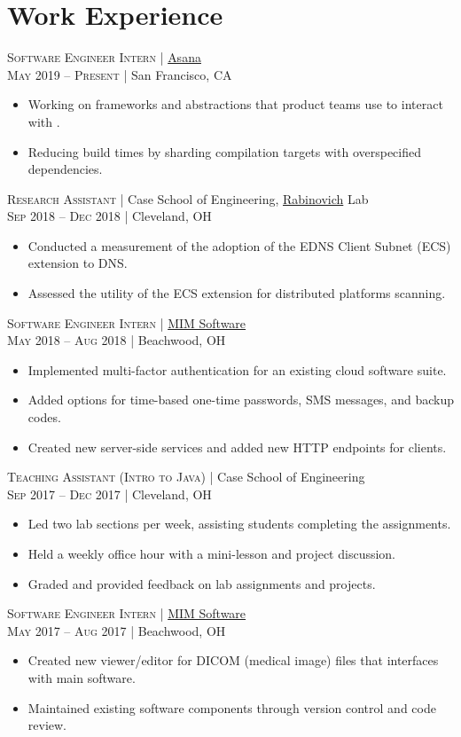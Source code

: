 \documentclass[a4paper,11pt]{article}
\begin{document}
\section{Work Experience}
\textsc{Software Engineer Intern} | \href{https://asana.com}{Asana} \\
\textsc{May 2019 – Present} | San Francisco, CA
\begin{itemize}
	\item Working on frameworks and abstractions that product teams use to interact with .
	\item Reducing build times by sharding compilation targets with overspecified dependencies.  
\end{itemize}
\vskip 2mm
\textsc{Research Assistant} | Case School of Engineering, \href{http://engr.case.edu/rabinovich_michael/}{Rabinovich} Lab \\
\textsc{Sep 2018 – Dec 2018} | Cleveland, OH
\begin{itemize}
	\item Conducted a measurement of the adoption of the EDNS Client Subnet (ECS) extension to DNS.
	\item Assessed the utility of the ECS extension for distributed platforms scanning.
\end{itemize}
\vskip 2mm
\textsc{Software Engineer Intern} | \href{https://www.mimsoftware.com}{MIM Software} \\
\textsc{May 2018 – Aug 2018} | Beachwood, OH
\begin{itemize}
	\item Implemented multi-factor authentication for an existing cloud software suite.
	\item Added options for time-based one-time passwords, SMS messages, and backup codes.
	\item Created new server-side services and added new HTTP endpoints for clients.
\end{itemize}
\vskip 2mm
\textsc{Teaching Assistant (Intro to Java)} | Case School of Engineering \\
 \textsc{Sep 2017 – Dec 2017} | Cleveland, OH
 \begin{itemize}
	 \item	Led two lab sections per week, assisting students completing the assignments.
	 \item Held a weekly office hour with a mini-lesson and project discussion.
	 \item Graded and provided feedback on lab assignments and projects.
 \end{itemize}
 \vskip 2mm
 \textsc{Software Engineer Intern} | \href{https://www.mimsoftware.com}{MIM Software} \\
 \textsc{May 2017 – Aug 2017} | Beachwood, OH
 \begin{itemize}
	\item Created new viewer/editor for DICOM (medical image) files that interfaces with main software.
	\item Maintained existing software components through version control and code review.
 \end{itemize}
\end{document}

